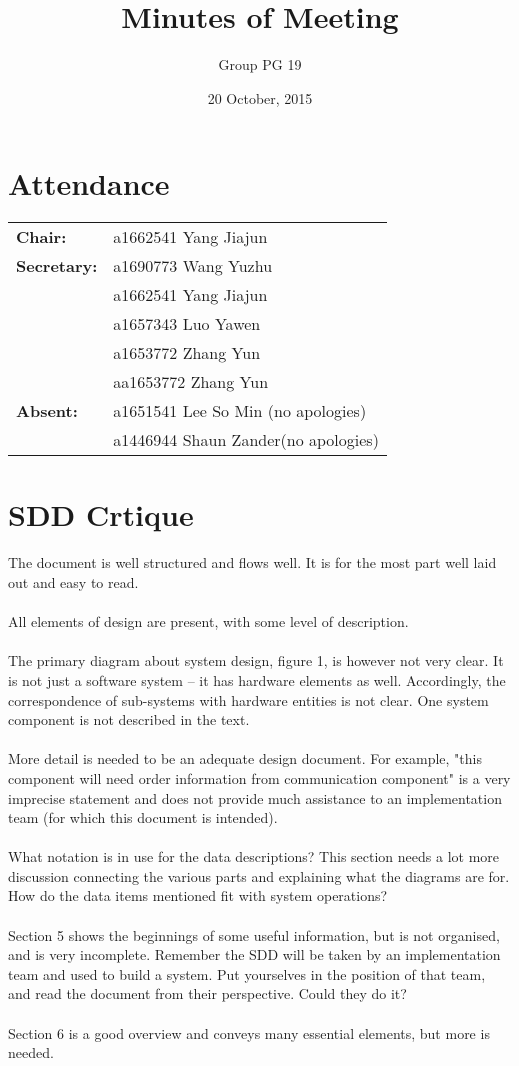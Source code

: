 \documentclass[a4paper]{article}
\title{Minutes of Meeting}
\author{Group PG 19}
\date{20 October, 2015}
\begin{document}
\maketitle
\section*{Attendance}
\begin{tabular}{l l}
\textbf{Chair:} 
&a1662541 Yang Jiajun\\
\textbf{Secretary:}&a1690773 Wang Yuzhu\\
&a1662541 Yang Jiajun\\
&a1657343 Luo Yawen\\
&a1653772 Zhang Yun\\
&aa1653772 Zhang Yun\\
\textbf{Absent:}&a1651541 Lee So Min (no apologies)\\ &a1446944 Shaun Zander(no apologies)
\end{tabular}

\section{SDD Crtique}
The document is well structured and flows well. It is for the most part well laid out and easy to read.\\
\\
All elements of design are present, with some level of description.\\
\\
The primary diagram about system design, figure 1, is however not very clear. It is not just a software system -- it has hardware elements as well. Accordingly, the correspondence of sub-systems with hardware entities is not clear. One system component is not described in the text.\\
\\
More detail is needed to be an adequate design document. For example, "this component will need order information from communication component" is a very imprecise statement and does not provide much
assistance to an implementation team (for which this document is intended).\\\
\\
What notation is in use for the data descriptions? This section needs a lot more discussion connecting the various parts and explaining what the diagrams are for. How do the data items mentioned fit with system operations?\\
\\
Section 5 shows the beginnings of some useful information, but is not organised, and is very incomplete. Remember the SDD will be taken by an implementation team and used to build a system. Put yourselves in the position of that team, and read the document from their perspective. Could they do it?\\
\\
Section 6 is a good overview and conveys many essential elements, but more is needed.\\
\end{document}
